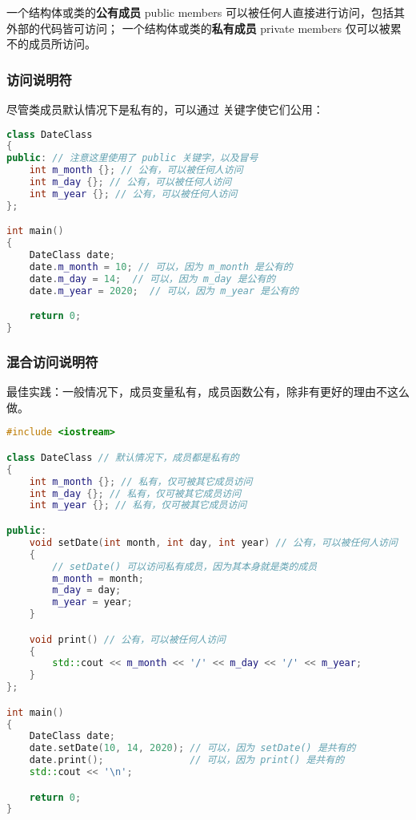 \documentclass[../../LearnCpp.tex]{subfiles}
\begin{document}

一个结构体或类的\textbf{公有成员} public members 可以被任何人直接进行访问，包括其外部的代码皆可访问；
一个结构体或类的\textbf{私有成员} private members 仅可以被累不的成员所访问。

\subsubsection*{访问说明符}

尽管类成员默认情况下是私有的，可以通过 关键字使它们公用：

\begin{lstlisting}[language=C++]
class DateClass
{
public: // 注意这里使用了 public 关键字，以及冒号
    int m_month {}; // 公有，可以被任何人访问
    int m_day {}; // 公有，可以被任何人访问
    int m_year {}; // 公有，可以被任何人访问
};

int main()
{
    DateClass date;
    date.m_month = 10; // 可以，因为 m_month 是公有的
    date.m_day = 14;  // 可以，因为 m_day 是公有的
    date.m_year = 2020;  // 可以，因为 m_year 是公有的

    return 0;
}
\end{lstlisting}

\subsubsection*{混合访问说明符}

最佳实践：一般情况下，成员变量私有，成员函数公有，除非有更好的理由不这么做。

\begin{lstlisting}[language=C++]
#include <iostream>

class DateClass // 默认情况下，成员都是私有的
{
    int m_month {}; // 私有，仅可被其它成员访问
    int m_day {}; // 私有，仅可被其它成员访问
    int m_year {}; // 私有，仅可被其它成员访问

public:
    void setDate(int month, int day, int year) // 公有，可以被任何人访问
    {
        // setDate() 可以访问私有成员，因为其本身就是类的成员
        m_month = month;
        m_day = day;
        m_year = year;
    }

    void print() // 公有，可以被任何人访问
    {
        std::cout << m_month << '/' << m_day << '/' << m_year;
    }
};

int main()
{
    DateClass date;
    date.setDate(10, 14, 2020); // 可以，因为 setDate() 是共有的
    date.print();               // 可以，因为 print() 是共有的
    std::cout << '\n';

    return 0;
}
\end{lstlisting}
\end{document}
